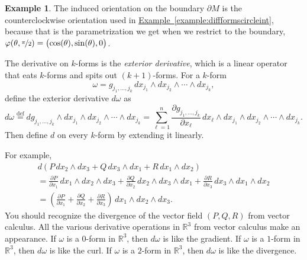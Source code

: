 \documentclass[12pt,openany]{book}
\newcommand{\R}{{\mathbb{R}}}
\newcommand{\myindex}[1]{#1\index{#1}}
\theoremstyle{plain}
\theoremstyle{remark}
\theoremstyle{definition}
\theoremstyle{exercise}
\theoremstyle{example}
\newtheorem{example}[thm]{Example}
\newcommand{\exampleref}[1]{\hyperref[#1]{Example~\ref*{#1}}}
\begin{document}
\begin{example}
The induced orientation on the boundary $\partial M$
is the counterclockwise orientation used in
\exampleref{example:diffformscircleint},
because that is the parametrization we get when we restrict
to the boundary, $\varphi(\theta,\nicefrac{\pi}{2}) =
\bigl(\cos(\theta),\sin(\theta),0\bigr)$.
\end{example}

\medskip

The derivative on $k$-forms is the
\emph{\myindex{exterior derivative}},
which is a linear operator that eats $k$-forms and spits out
$(k+1)$-forms.  For a $k$-form
\begin{equation*}
\omega =
g_{j_1,\ldots,j_k}
\,
dx_{j_1} \wedge
dx_{j_2} \wedge
\cdots \wedge
dx_{j_k}  ,
\end{equation*}
define the exterior derivative $d\omega$ as
%
\begin{equation*}
d\omega
\overset{\text{def}}{=} 
dg_{j_1,\ldots,j_k}
\wedge
dx_{j_1} \wedge
dx_{j_2} \wedge
\cdots \wedge
dx_{j_k}  =
\sum_{\ell=1}^n
\frac{\partial g_{j_1,\ldots,j_k}}{\partial x_\ell} \,
dx_\ell \wedge
dx_{j_1} \wedge
dx_{j_2} \wedge
\cdots \wedge
dx_{j_k} .
\end{equation*}
Then define $d$ on every $k$-form by extending it linearly.

For example,
\begin{multline*}
d \left(
P \, dx_2 \wedge dx_3
+
Q \, dx_3 \wedge dx_1
+
R \, dx_1 \wedge dx_2
\right)
\\
=
\frac{\partial P}{\partial x_1} \, dx_1 \wedge dx_2 \wedge dx_3
+
\frac{\partial Q}{\partial x_2} \, dx_2 \wedge dx_3 \wedge dx_1
+
\frac{\partial R}{\partial x_3} \, dx_3 \wedge dx_1 \wedge dx_2
\\
=
\left(
\frac{\partial P}{\partial x_1}
+
\frac{\partial Q}{\partial x_2} 
+
\frac{\partial R}{\partial x_3}
\right) \, dx_1 \wedge dx_2 \wedge dx_3 .
\end{multline*}
You should recognize the divergence of the vector field $(P,Q,R)$ from vector
calculus.
All the various derivative operations in $\R^3$ from vector calculus make an
appearance.
If $\omega$ is a $0$-form in $\R^3$, then $d\omega$ is like the gradient.
If $\omega$ is a $1$-form in $\R^3$, then $d\omega$ is like the curl.
If $\omega$ is a $2$-form in $\R^3$, then $d\omega$ is like the divergence.

\medskip
\end{document}
